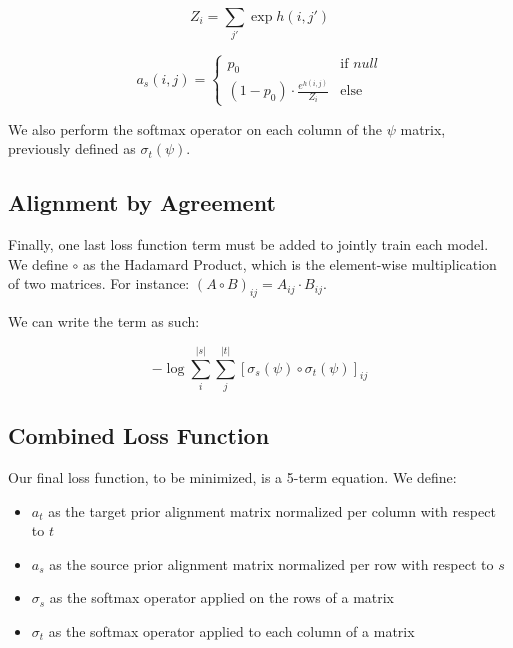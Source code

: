 \documentclass[twoside,twocolumn]{article}
\newlength\mystoreparindent
\newenvironment{myparindent}[1]{%
  \setlength{\mystoreparindent}{\the\parindent}
  \setlength{\parindent}{#1}
  }{%
  \setlength{\parindent}{\mystoreparindent}
}
\begin{document}
\begin{myparindent}{0pt}
\begin{equation}
  Z_i = \sum_{j'} \exp h(i, j')
\end{equation}

\begin{equation}
a_s (i, j) =
\begin{cases}
      p_0 & \text{if } null \\
     (1-p_0) \cdot \frac{e^{h(i,j)}}{Z_i} & \text{else}
   \end{cases}
\end{equation}

We also perform the softmax operator on each column of the $\psi$ matrix,
previously defined as $\sigma_t(\psi)$.


\subsection{Alignment by Agreement}

Finally, one last loss function term must be added to jointly train each model.
We define $\circ$ as the Hadamard Product, which is the element-wise
multiplication of two matrices. For instance:
$(A \circ B)_{ij} = A_{ij} \cdot B_{ij}$.

We can write the term as such:

\begin{equation}
  -\log \sum_i^{|s|} \sum_j^{|t|}
    \left[ \sigma_s(\psi) \circ \sigma_t(\psi) \right]_{ij}
\end{equation}



\subsection{Combined Loss Function}

Our final loss function, to be minimized, is a 5-term equation. We define:
\begin{itemize}[label={}]
  \item $a_t$ as the target prior alignment matrix normalized per column with respect to $t$\\ %
  \item $a_s$ as the source prior alignment matrix normalized per row with respect to $s$\\ %
  \item $\sigma_s$ as the softmax operator applied on the rows of a matrix\\
  \item $\sigma_t$ as the softmax operator applied to each column of a matrix
\end{itemize}


\end{myparindent}
\end{document}
